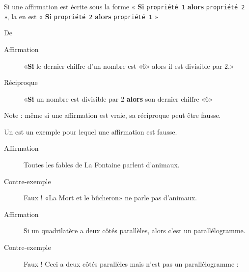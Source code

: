 
\begin{definition}
    Si une affirmation est écrite sous la forme «  {\bf Si} \texttt{propriété 1} {\bf alors} \texttt{propriété 2} », la  en est «  {\bf Si} \texttt{propriété 2} {\bf alors} \texttt{propriété 1} »
\end{definition}
De \cite{XEFooQxuWQb}

\begin{example}
    \begin{description}
        \item[Affirmation] «{\bf Si} le dernier chiffre d'un nombre est «\( 6\)» alors il est divisible par \( 2\).» 
        \item[Réciproque] «{\bf Si} un nombre est divisible par \( 2\) {\bf alors} son dernier chiffre «\( 6\)» 
    \end{description}
    Note : même si une affirmation est vraie, sa réciproque peut être fausse.
\end{example}

\begin{definition}
    Un  est un exemple pour lequel une affirmation est fausse.
\end{definition}

\begin{example}
    \begin{description}
        \item[Affirmation] Toutes les fables de La Fontaine parlent d'animaux.
        \item[Contre-exemple] Faux ! «La Mort et le bûcheron» ne parle pas d'animaux.
    \end{description}
\end{example}

\begin{example}
    \begin{description}
        \item[Affirmation] Si un quadrilatère a deux côtés parallèles, alors c'est un parallélogramme.
        \item[Contre-exemple] Faux ! Ceci a deux côtés parallèles mais n'est pas un parallélogramme :
            \begin{center}
               
            \end{center}
    \end{description}
\end{example}


